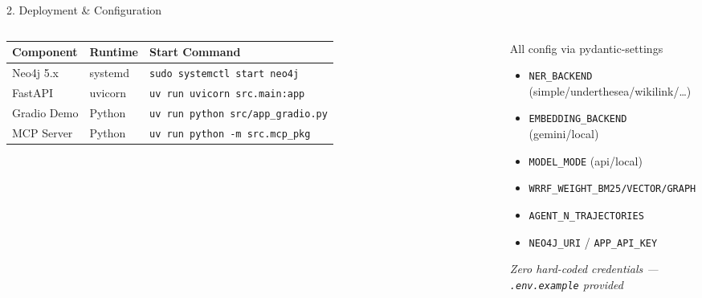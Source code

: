 \documentclass[aspectratio=169]{beamer}
\begin{document}
\begin{frame}[shrink=5]{2. Deployment \& Configuration}
\begin{columns}[T]
\begin{tabular}{@{}lll@{}}
\toprule
\textbf{Component} & \textbf{Runtime} & \textbf{Start Command} \\
\midrule
Neo4j 5.x   & systemd  & \texttt{\scriptsize sudo systemctl start neo4j} \\
FastAPI     & uvicorn  & \texttt{\scriptsize uv run uvicorn src.main:app} \\
Gradio Demo & Python   & \texttt{\scriptsize uv run python src/app\_gradio.py} \\
MCP Server  & Python   & \texttt{\scriptsize uv run python -m src.mcp\_pkg} \\
\bottomrule
\end{tabular}

\begin{exampleblock}{All config via pydantic-settings}
\begin{itemize}\setlength\itemsep{1pt}\scriptsize
  \item \texttt{NER\_BACKEND} (simple/underthesea/wikilink/\ldots)
  \item \texttt{EMBEDDING\_BACKEND} (gemini/local)
  \item \texttt{MODEL\_MODE} (api/local)
  \item \texttt{WRRF\_WEIGHT\_BM25/VECTOR/GRAPH}
  \item \texttt{AGENT\_N\_TRAJECTORIES}
  \item \texttt{NEO4J\_URI} / \texttt{APP\_API\_KEY}
\end{itemize}
\smallskip
\textit{Zero hard-coded credentials --- \texttt{.env.example} provided}
\end{exampleblock}
\end{columns}
\end{frame}
\end{document}
